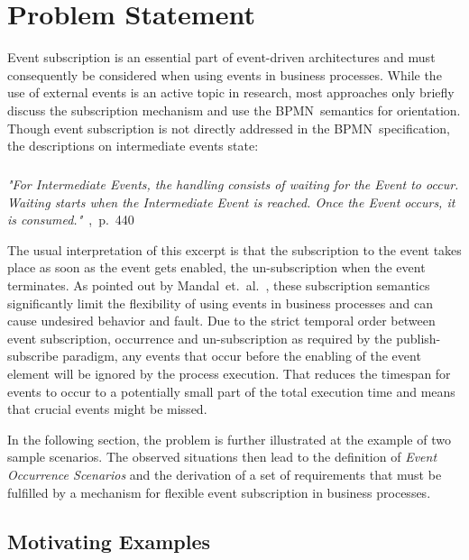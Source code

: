 \chapter{Problem Statement}\label{ch:problemstatement}

Event subscription is an essential part of event-driven architectures and must consequently be considered when using events in business processes.
While the use of external events is an active topic in research, most approaches only briefly discuss the subscription mechanism and use the \acs{BPMN}~semantics for orientation.
Though event subscription is not directly addressed in the BPMN~specification, the descriptions on intermediate events state:

\paragraph{}
\textit{"For Intermediate Events, the handling consists of waiting for the Event to occur. Waiting starts when the
Intermediate Event is reached. Once the Event occurs, it is consumed."}~\cite{bpmnspec},~p.~440\newline

\noindent The usual interpretation of this excerpt is that the subscription to the event takes place as soon as the event gets enabled, the un-subscription when the event terminates.
As pointed out by Mandal~et.~al.~\cite{mandal:2017}, these subscription semantics significantly limit the flexibility of using events in business processes and can cause undesired behavior and fault.
Due to the strict temporal order between event subscription, occurrence and un-subscription as required by the publish-subscribe paradigm, any events that occur before the enabling of the event element will be ignored by the process execution.
That reduces the timespan for events to occur to a potentially small part of the total execution time and means that crucial events might be missed.

In the following section, the problem is further illustrated at the example of two sample scenarios.
The observed situations then lead to the definition of \textit{Event Occurrence Scenarios} and the derivation of a set of requirements that must be fulfilled by a mechanism for flexible event subscription in business processes.

\section{Motivating Examples}\label{ch:motivatingexamples}

